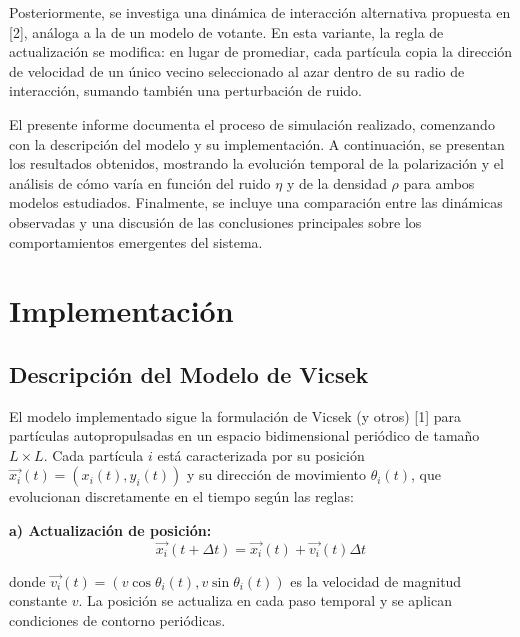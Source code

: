 \documentclass{article}
\begin{document}
\medskip

Posteriormente, se investiga una dinámica de interacción alternativa propuesta en [2], análoga a la de un modelo de votante. En esta variante, la regla de actualización se modifica: en lugar de promediar, cada partícula copia la dirección de velocidad de un único vecino seleccionado al azar dentro de su radio de interacción, sumando también una perturbación de ruido.

\medskip

El presente informe documenta el proceso de simulación realizado, comenzando con la descripción del modelo y su implementación. A continuación, se presentan los resultados obtenidos, mostrando la evolución temporal de la polarización y el análisis de cómo varía en función del ruido $\eta$ y de la densidad $\rho$ para ambos modelos estudiados. Finalmente, se incluye una comparación entre las dinámicas observadas y una discusión de las conclusiones principales sobre los comportamientos emergentes del sistema.

\section{Implementación}

\subsection{Descripción del Modelo de Vicsek}
El modelo implementado sigue la formulación de Vicsek (y otros) [1] para partículas autopropulsadas en un espacio bidimensional periódico de tamaño $L \times L$. Cada partícula $i$ está caracterizada por su posición $\vec{x_i}(t) = (x_i(t), y_i(t))$ y su dirección de movimiento $\theta_i(t)$, que evolucionan discretamente en el tiempo según las reglas:

\textbf{a) Actualización de posición:}
\begin{equation}
\vec{x_i}(t + \Delta t) = \vec{x_i}(t) + \vec{v_i}(t) \Delta t
\label{eq:posicion}
\end{equation}

donde $\vec{v_i}(t) = (v \cos \theta_i(t), v \sin \theta_i(t))$ es la velocidad de magnitud constante $v$. La posición se actualiza en cada paso temporal y se aplican condiciones de contorno periódicas.
\end{document}
